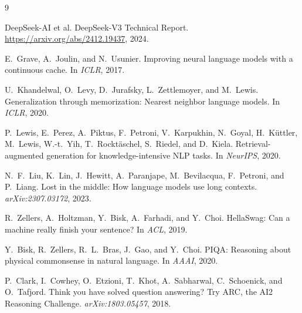 \documentclass{article}
\begin{document}
\begin{thebibliography}{9}

DeepSeek-AI et al.
\newblock DeepSeek-V3 Technical Report.
\newblock \url{https://arxiv.org/abs/2412.19437}, 2024.

E.~Grave, A.~Joulin, and N.~Usunier.
\newblock Improving neural language models with a continuous cache.
\newblock In \emph{ICLR}, 2017.

U.~Khandelwal, O.~Levy, D.~Jurafsky, L.~Zettlemoyer, and M.~Lewis.
\newblock Generalization through memorization: Nearest neighbor language models.
\newblock In \emph{ICLR}, 2020.

P.~Lewis, E.~Perez, A.~Piktus, F.~Petroni, V.~Karpukhin, N.~Goyal, H.~K\"uttler, M.~Lewis, W.-t.~Yih, T.~Rockt\"aschel, S.~Riedel, and D.~Kiela.
\newblock Retrieval-augmented generation for knowledge-intensive NLP tasks.
\newblock In \emph{NeurIPS}, 2020.

N.~F.~Liu, K.~Lin, J.~Hewitt, A.~Paranjape, M.~Bevilacqua, F.~Petroni, and P.~Liang.
\newblock Lost in the middle: How language models use long contexts.
\newblock \textit{arXiv:2307.03172}, 2023.

R.~Zellers, A.~Holtzman, Y.~Bisk, A.~Farhadi, and Y.~Choi.
\newblock HellaSwag: Can a machine really finish your sentence?
\newblock In \emph{ACL}, 2019.

Y.~Bisk, R.~Zellers, R.~L.~Bras, J.~Gao, and Y.~Choi.
\newblock PIQA: Reasoning about physical commonsense in natural language.
\newblock In \emph{AAAI}, 2020.

P.~Clark, I.~Cowhey, O.~Etzioni, T.~Khot, A.~Sabharwal, C.~Schoenick, and O.~Tafjord.
\newblock Think you have solved question answering? Try ARC, the AI2 Reasoning Challenge.
\newblock \textit{arXiv:1803.05457}, 2018.

\end{thebibliography}
\end{document}
